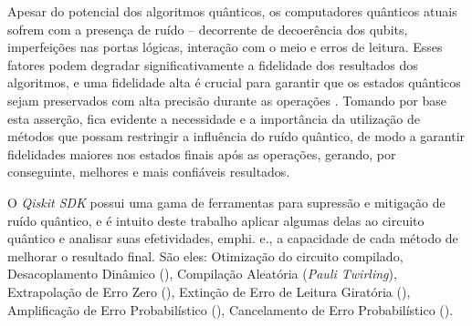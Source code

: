 Apesar do potencial dos algoritmos qu\^{a}nticos, os computadores qu\^{a}nticos atuais sofrem com a presença de ruído – decorrente de decoer\^{e}ncia dos qubits, imperfeições nas portas lógicas, interaç\~{a}o com o meio e erros de leitura. Esses fatores podem degradar significativamente a fidelidade dos resultados dos algoritmos, e uma fidelidade alta \'{e} crucial para garantir que os estados qu\^{a}nticos sejam preservados com alta precis\~{a}o durante as operações \cite{jozsa1994_Fidelidade}. Tomando por base esta asserç\~{a}o, fica evidente a necessidade e a import\^{a}ncia da utilizaç\~{a}o de m\'{e}todos que possam restringir a influ\^{e}ncia do ruído qu\^{a}ntico, de modo a garantir fidelidades maiores nos estados finais após as operações, gerando, por conseguinte, melhores e mais confi\'{a}veis resultados. 

O \emph{Qiskit SDK} possui uma gama de ferramentas para supress\~{a}o e mitigaç\~{a}o de ruído qu\^{a}ntico, e \'{e} intuito deste trabalho aplicar algumas delas ao circuito qu\^{a}ntico e analisar suas efetividades, emph{i. e.}, a capacidade de cada m\'{e}todo de melhorar o resultado final. S\~{a}o eles: Otimizaç\~{a}o do circuito compilado, Desacoplamento Din\^{a}mico (), Compilaç\~{a}o Aleatória (\textit{Pauli Twirling}),  Extrapolaç\~{a}o de Erro Zero (), Extinç\~{a}o de Erro de Leitura Giratória (), Amplificaç\~{a}o de Erro Probabilístico (), Cancelamento de Erro Probabilístico ().


